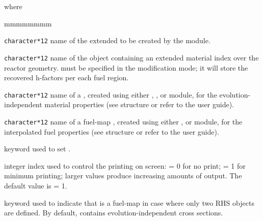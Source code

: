 \noindent where
\begin{ListeDeDescription}{mmmmmmmm}

\item[\dusa{MACRO2}] \texttt{character*12} name of the extended
 to be created by the module.

\item[\dusa{MATEX}] \texttt{character*12} name of the 
object containing an extended material index over the reactor geometry.
 must be specified in the modification mode; it will store
the recovered h-factors per each fuel region.

\item[\dusa{MACRO}] \texttt{character*12} name of a , created
using either , ,  or  module, for the evolution-independent
material properties (see structure  or refer to the user guide\cite{dragon}).

\item[\dusa{MACFL}] \texttt{character*12} name of a fuel-map ,
created using either ,  or  module, for the interpolated fuel
properties (see structure  or refer to the user guide\cite{dragon}).

\item[\moc{EDIT}] keyword used to set .

\item[\dusa{iprint}] integer index used to control the printing on screen: = 0 for
no print; = 1 for minimum printing; larger values produce increasing amounts of
output. The default value is  = 1.

\item[\moc{FUEL}] keyword used to indicate that  is a fuel-map  in case where only two RHS
objects are defined. By default,  contains evolution-independent cross sections.

\end{ListeDeDescription}
\clearpage
